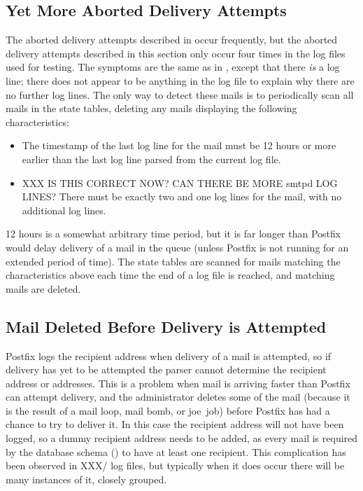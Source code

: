 \subsection{Yet More Aborted Delivery Attempts}

\label{yet more aborted delivery attempts}

The aborted delivery attempts described in  occur frequently, but the aborted delivery attempts described in
this section only occur four times in the \numberOFlogFILES{} log files
used for testing.  The symptoms are the same as in , except that there \textit{is\/} a  log
line; there does not appear to be anything in the log file to explain why
there are no further log lines.  The only way to detect these mails is to
periodically scan all mails in the state tables, deleting any mails
displaying the following characteristics:

\begin{itemize}

    \item The timestamp of the last log line for the mail must be 12 hours
        or more earlier than the last log line parsed from the current log
        file.

    \item XXX IS THIS CORRECT NOW\@?  CAN THERE BE MORE smtpd LOG LINES\@?
        There must be exactly two  and one 
        log lines for the mail, with no additional log lines.

\end{itemize}

12 hours is a somewhat arbitrary time period, but it is far longer than
Postfix would delay delivery of a mail in the queue (unless Postfix is not
running for an extended period of time).  The state tables are scanned for
mails matching the characteristics above each time the end of a log file is
reached, and matching mails are deleted.

\subsection{Mail Deleted Before Delivery is Attempted}

\label{Mail deleted before delivery is attempted}

Postfix logs the recipient address when delivery of a mail is attempted, so
if delivery has yet to be attempted the parser cannot determine the
recipient address or addresses.  This is a problem when mail is arriving
faster than Postfix can attempt delivery, and the administrator deletes
some of the mail (because it is the result of a mail loop, mail bomb, or joe~job) before
Postfix has had a chance to try to deliver it.  In this case the recipient
address will not have been logged, so a dummy recipient address needs to be
added, as every mail is required by the database schema
() to have at least one recipient.  This
complication has been observed in XXX/\numberOFlogFILES{} log files, but
typically when it does occur there will be many instances of it, closely
grouped.

